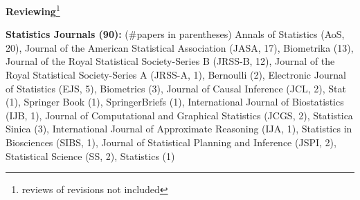 \documentclass{article}
\begin{document}










\vspace{7mm}
\begin{large}
\noindent \textbf{Reviewing}\footnote{reviews of revisions not included}
\end{large}

\vspace{2mm}
\noindent \textbf{Statistics Journals (90): }(\#papers in parentheses) Annals of Statistics (AoS, 20), Journal of the American Statistical Association (JASA, 17), Biometrika (13), Journal of the Royal Statistical Society-Series B (JRSS-B, 12), Journal of the Royal Statistical Society-Series A (JRSS-A, 1), Bernoulli (2), Electronic Journal of Statistics (EJS, 5), Biometrics (3), Journal of Causal Inference (JCL, 2), Stat (1), Springer Book (1), SpringerBriefs (1), International Journal of Biostatistics (IJB, 1), Journal of Computational and Graphical Statistics (JCGS, 2), Statistica Sinica (3), International Journal of Approximate Reasoning (IJA, 1), Statistics in Biosciences (SIBS, 1), Journal of Statistical Planning and Inference (JSPI, 2), Statistical Science (SS, 2), Statistics (1)
\end{document}
